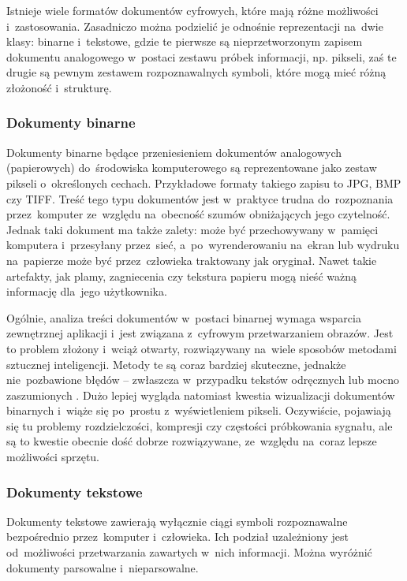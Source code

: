 Istnieje wiele formatów dokumentów cyfrowych, które mają różne możliwości i~zastosowania. Zasadniczo można podzielić je odnośnie reprezentacji na~dwie klasy: binarne i~tekstowe, gdzie te pierwsze są nieprzetworzonym zapisem dokumentu analogowego w~postaci zestawu próbek informacji, np. pikseli, zaś te drugie są pewnym zestawem rozpoznawalnych symboli, które mogą mieć różną złożoność i~strukturę.

\subsubsection{Dokumenty binarne} 
\label{sec:DokumentyBinarne}

Dokumenty binarne będące przeniesieniem dokumentów analogowych (papierowych) do~środowiska komputerowego są reprezentowane jako zestaw pikseli o~określonych cechach. Przykładowe formaty takiego zapisu to JPG, BMP czy TIFF. 
Treść tego typu dokumentów jest w~praktyce trudna do~rozpoznania przez~komputer ze~względu na~obecność szumów obniżających jego czytelność. 
Jednak taki dokument ma także zalety: może być przechowywany w~pamięci komputera i~przesyłany przez~sieć, a~po~wyrenderowaniu na~ekran lub wydruku na~papierze może być przez~człowieka traktowany jak oryginał. Nawet takie artefakty, jak plamy, zagniecenia czy tekstura papieru mogą nieść ważną informację dla~jego użytkownika.

Ogólnie, analiza treści dokumentów w~postaci binarnej wymaga wsparcia zewnętrznej aplikacji i~jest związana z~cyfrowym przetwarzaniem obrazów. Jest to problem złożony i~wciąż otwarty, rozwiązywany na~wiele sposobów metodami sztucznej inteligencji. Metody te są coraz bardziej skuteczne, jednakże nie~pozbawione błędów -- zwłaszcza w~przypadku tekstów odręcznych lub mocno zaszumionych \cite{OCRReview, Handwritting:2011}. Dużo lepiej wygląda natomiast kwestia wizualizacji dokumentów binarnych i~wiąże się po~prostu z~wyświetleniem pikseli. Oczywiście, pojawiają się tu problemy rozdzielczości, kompresji czy częstości próbkowania sygnału, ale są to kwestie obecnie dość dobrze rozwiązywane, ze~względu na~coraz lepsze możliwości sprzętu. 

\subsubsection{Dokumenty tekstowe}
\label{sec:DokumentyTekstowe}

Dokumenty tekstowe zawierają wyłącznie ciągi symboli rozpoznawalne bezpośrednio przez~komputer i~człowieka. Ich podział uzależniony jest od~możliwości przetwarzania zawartych w~nich informacji. Można wyróżnić dokumenty parsowalne i~nieparsowalne. 

